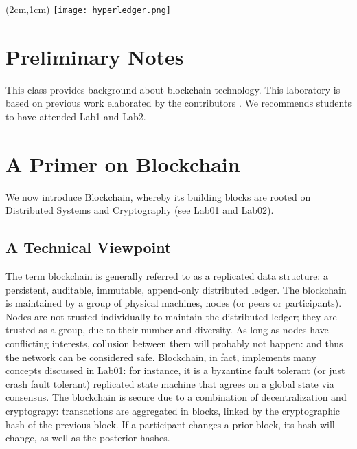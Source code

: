 \documentclass[12pt,a4paper]{article}
\theoremstyle{definition}
\begin{document}
\textblockorigin{-34pt}{-12pt}
\begin{textblock*}{10cm}(2cm,1cm)
\texttt{[image: hyperledger.png]}
\end{textblock*}

\section*{Preliminary Notes}
This class provides background about blockchain technology. This laboratory is based on previous work elaborated by the contributors \cite{belchior2019_audits,belchior2020,belchior2019_thesis}. We recommends students to have attended Lab1 and Lab2.






\section{A Primer on Blockchain}
We now introduce Blockchain, whereby its building blocks are rooted on Distributed Systems and Cryptography (see Lab01 and Lab02). 



\subsection{A Technical Viewpoint}
The term blockchain is generally referred to as a replicated data structure: a persistent, auditable, immutable, append-only distributed ledger. The blockchain is maintained by a group of physical machines, nodes (or peers or participants). Nodes are not trusted individually to maintain the distributed ledger; they are trusted as a group, due to their number and diversity. As long as nodes have conflicting interests, collusion between them will probably not happen: and thus the network can be considered safe. Blockchain, in fact, implements many concepts discussed in Lab01: for instance, it is a byzantine fault tolerant (or just crash fault tolerant) replicated state machine that agrees on a global state via consensus. The blockchain is secure due to a combination of decentralization and cryptograpy: transactions are aggregated in blocks, linked by the cryptographic hash of the previous block. If a participant changes a prior block, its hash will change, as well as the posterior hashes. 
\end{document}
